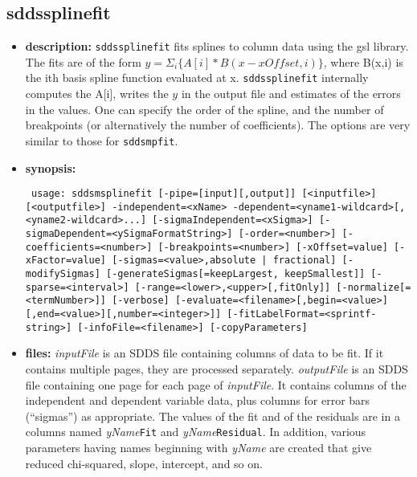 \newpage
\subsection{sddssplinefit}
\label{sddssplinefit}

\begin{itemize}
\item {\bf description:} 
{\tt sddssplinefit} fits splines to column data using the gsl library. The fits are of the form $y = \Sigma_i \{ A[i] * B(x-xOffset, i)\}$, where B(x,i) is the ith basis spline function evaluated at x.  {\tt sddssplinefit} internally computes the A[i], writes the $y$ in the output file and estimates of the errors in the values. One can specify the order of the spline, and the number of breakpoints (or alternatively the number of coefficients).  The options are very similar to those for {\tt sddsmpfit}.
\item {\bf synopsis:} 
\begin{flushleft}{\tt
usage: sddsmsplinefit [-pipe=[input][,output]] [<inputfile>] [<outputfile>]
  -independent=<xName> -dependent=<yname1-wildcard>[,<yname2-wildcard>...]
  [-sigmaIndependent=<xSigma>] [-sigmaDependent=<ySigmaFormatString>]
  [-order=<number>] [-coefficients=<number>] [-breakpoints=<number>]
  [-xOffset=value] [-xFactor=value]
  [-sigmas=<value>,{absolute | fractional}] 
  [-modifySigmas] [-generateSigmas[={keepLargest, keepSmallest}]]
  [-sparse=<interval>] [-range=<lower>,<upper>[,fitOnly]]
  [-normalize[=<termNumber>]] [-verbose]
  [-evaluate=<filename>[,begin=<value>][,end=<value>][,number=<integer>]]
  [-fitLabelFormat=<sprintf-string>] [-infoFile=<filename>]
  [-copyParameters]
}\end{flushleft}
\item {\bf files:}
{\em inputFile} is an SDDS file containing columns of data to be fit. 
If it contains multiple pages, they are processed separately. 
{\em outputFile} is an SDDS file containing one page for each page of {\em inputFile}. 
It contains columns of the independent and dependent variable data, plus columns for error bars (``sigmas'') as appropriate. 
The values of the fit and of the residuals are in a columns named {\em yName}{\tt Fit} and {\em yName}{\tt Residual}.
In addition, various parameters having names beginning with {\em yName} are created that give reduced chi-squared, slope, intercept, and so on.


\end{itemize}

